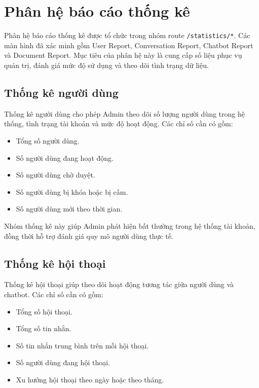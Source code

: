 \section{Phân hệ báo cáo thống kê}

Phân hệ báo cáo thống kê được tổ chức trong nhóm route \texttt{/statistics/*}. Các màn hình đã xác minh gồm User Report, Conversation Report, Chatbot Report và Document Report. Mục tiêu của phân hệ này là cung cấp số liệu phục vụ quản trị, đánh giá mức độ sử dụng và theo dõi tình trạng dữ liệu.

\subsection{Thống kê người dùng}

Thống kê người dùng cho phép Admin theo dõi số lượng người dùng trong hệ thống, tình trạng tài khoản và mức độ hoạt động. Các chỉ số cần có gồm:

\begin{itemize}
    \item Tổng số người dùng.
    \item Số người dùng đang hoạt động.
    \item Số người dùng chờ duyệt.
    \item Số người dùng bị khóa hoặc bị cấm.
    \item Số người dùng mới theo thời gian.
\end{itemize}

Nhóm thống kê này giúp Admin phát hiện bất thường trong hệ thống tài khoản, đồng thời hỗ trợ đánh giá quy mô người dùng thực tế.

\subsection{Thống kê hội thoại}

Thống kê hội thoại giúp theo dõi hoạt động tương tác giữa người dùng và chatbot. Các chỉ số cần có gồm:

\begin{itemize}
    \item Tổng số hội thoại.
    \item Tổng số tin nhắn.
    \item Số tin nhắn trung bình trên mỗi hội thoại.
    \item Số người dùng đang hội thoại.
    \item Xu hướng hội thoại theo ngày hoặc theo tháng.
\end{itemize}

